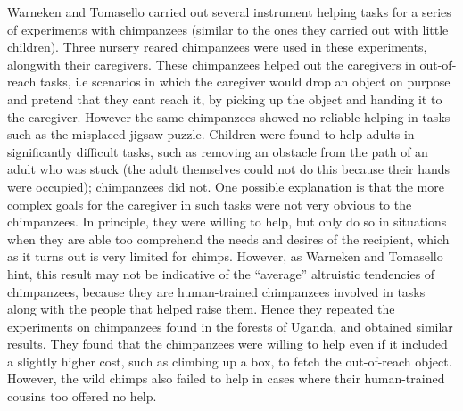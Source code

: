 \documentclass[12pt, letter]{article}
\begin{document}
Warneken and Tomasello \cite{warneken2009roots} carried out several instrument helping tasks for a series of experiments with chimpanzees (similar to the ones they carried out with little children). Three nursery reared chimpanzees were used in these experiments, alongwith their caregivers. These chimpanzees helped out the caregivers in out-of-reach tasks, i.e scenarios in which the caregiver would drop an object on purpose and pretend that they cant reach it, by picking up the object and handing it to the caregiver. However the same chimpanzees showed no reliable helping in tasks such as the misplaced jigsaw puzzle. Children were found to help adults in significantly difficult tasks, such as removing an obstacle from the path of an adult who was stuck (the adult themselves could not do this because their hands were occupied); chimpanzees did not. One possible explanation is that the more complex goals for the caregiver in such tasks were not very obvious to the chimpanzees. In principle, they were willing to help, but only do so in situations when they are able too comprehend the needs and desires of the recipient, which as it turns out is very limited for chimps. However, as Warneken and Tomasello hint, this result may not be indicative of the ``average'' altruistic tendencies of chimpanzees, because they are human-trained chimpanzees involved in tasks along with the people that helped raise them. Hence they repeated the experiments on chimpanzees found in the forests of Uganda, and obtained similar results. They found that the chimpanzees were willing to help even if it included a slightly higher cost, such as climbing up a box, to fetch the out-of-reach object. However, the wild chimps also failed to help in cases where their human-trained cousins too offered no help.
\end{document}
